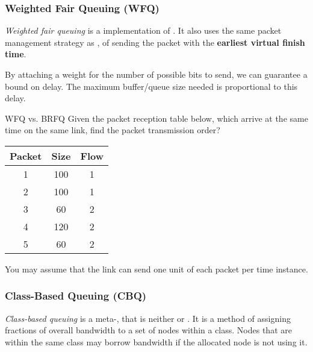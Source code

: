 \subsubsection{Weighted Fair Queuing (WFQ)}\label{subsubsec:Weighted_Fair_Queuing}
\begin{definition}\label{def:Weighted_Fair_Queuing}
  \emph{Weighted fair queuing} is a  implementation of .
  It also uses the same packet management strategy as , of sending the packet with the \textbf{earliest virtual finish time}.

  By attaching a weight for the number of possible bits to send, we can guarantee a bound on delay.
  The maximum buffer/queue size needed is proportional to this delay.
\end{definition}

\begin{example}[Lecture 5]{WFQ vs. BRFQ}
  Given the packet reception table below, which arrive at the same time on the same link, find the packet transmission order?
  \begin{center}
    \begin{tabular}{ccc}
      \toprule
      Packet & Size & Flow \\
      \midrule
      1 & 100 & 1 \\
      2 & 100 & 1 \\
      3 & 60 & 2 \\
      4 & 120 & 2 \\
      5 & 60 & 2 \\
      \bottomrule
    \end{tabular}
\end{center}


  You may assume that the link can send one unit of each packet per time instance.
  \tcblower{}
\end{example}

\subsubsection{Class-Based Queuing (CBQ)}\label{subsubsec:Class_Based_Queuing}
\begin{definition}\label{def:Class_Based_Queuing}
  \emph{Class-based queuing} is a meta-, that is neither  or .
  It is a method of assigning fractions of overall bandwidth to a set of nodes within a class.
  Nodes that are within the same class may borrow bandwidth if the allocated node is not using it.
\end{definition}

